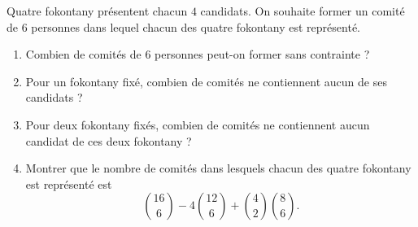 Quatre fokontany présentent chacun $4$ candidats. On souhaite former un
comité de $6$ personnes dans lequel chacun des quatre fokontany est
représenté.
\begin{enumerate}
  \item Combien de comités de $6$ personnes peut-on former sans contrainte ?
  \item Pour un fokontany fixé, combien de comités ne contiennent aucun de ses
  candidats ?
  \item Pour deux fokontany fixés, combien de comités ne contiennent aucun
  candidat de ces deux fokontany ?
  \item Montrer que le nombre de comités dans lesquels chacun des quatre
  fokontany est représenté est
  \[
  \binom{16}{6} - 4\binom{12}{6} + \binom{4}{2}\binom{8}{6}.
  \]
\end{enumerate}
